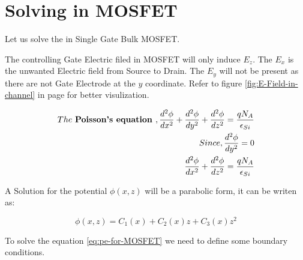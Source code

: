 \documentclass[a4paper]{article}
\begin{document}
\section{Solving \PE in MOSFET}

Let us solve the \PE in Single Gate Bulk MOSFET.

The controlling Gate Electric filed in MOSFET will only induce $E_z$. The $E_x$ is the unwanted Electric field from Source to Drain. The $E_y$ will not be present as there are not Gate Electrode at the $y$ coordinate. Refer to figure \ref{fig:E-Field-in-channel} in page \pageref{fig:E-Field-in-channel} for better visulization.


\begin{align*}
  The~\textbf{Poisson's equation }, \frac {d^2\phi} {dx^2} + \frac {d^2\phi} {dy^2} + \frac {d^2\phi} {dz^2} = \frac{qN_A} {\epsilon_{Si}}\\
  Since, \frac {d^2\phi} {dy^2} = 0\\
  \frac {d^2\phi} {dx^2} + \frac {d^2\phi} {dz^2} = \frac{qN_A} {\epsilon_{Si}}
\end{align*}

A Solution for the potential $\phi(x,z)$ will be a parabolic form, it can be writen as:

\begin{equation}
  \label{eq:pe-for-MOSFET}
  \phi(x,z) = C_1(x) + C_2(x)z  + C_3(x)z^2
\end{equation}

To solve the equation \ref{eq:pe-for-MOSFET} we need to define some boundary conditions.
\end{document}
